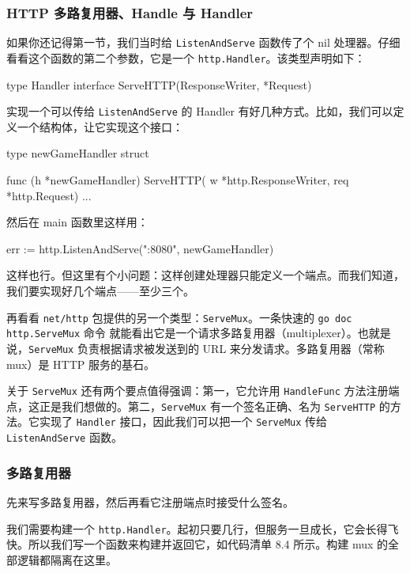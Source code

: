 \subsubsection*{HTTP 多路复用器、Handle 与 Handler}

如果你还记得第一节，我们当时给 \texttt{ListenAndServe} 函数传了个 nil 处理器。仔细看看这个函数的第二个参数，它是一个 \texttt{http.Handler}。该类型声明如下：

\begin{gocode}[]
type Handler interface {
    ServeHTTP(ResponseWriter, *Request)
}
\end{gocode}

实现一个可以传给 \texttt{ListenAndServe} 的 Handler 有好几种方式。比如，我们可以定义一个结构体，让它实现这个接口：

\begin{gocode}[]
type newGameHandler struct {}

func (h *newGameHandler) ServeHTTP(
    w *http.ResponseWriter, req *http.Request) {
    ...
}
\end{gocode}

然后在 main 函数里这样用：

\begin{gocode}[]
err := http.ListenAndServe(":8080", newGameHandler{})
\end{gocode}

这样也行。但这里有个小问题：这样创建处理器只能定义一个端点。而我们知道，我们要实现好几个端点——至少三个。

再看看 \texttt{net/http} 包提供的另一个类型：\texttt{ServeMux}。一条快速的 \texttt{go doc http.ServeMux} 命令
就能看出它是一个请求多路复用器（multiplexer）。也就是说，\texttt{ServeMux} 负责根据请求被发送到的 URL 来分发请求。多路复用器（常称 mux）是 HTTP 服务的基石。

关于 \texttt{ServeMux} 还有两个要点值得强调：第一，它允许用 \texttt{HandleFunc} 方法注册端点，这正是我们想做的。第二，\texttt{ServeMux} 有一个签名正确、名为 \texttt{ServeHTTP} 的方法。它实现了 \texttt{Handler} 接口，因此我们可以把一个 \texttt{ServeMux} 传给 \texttt{ListenAndServe} 函数。

\subsubsection*{多路复用器}

先来写多路复用器，然后再看它注册端点时接受什么签名。

我们需要构建一个 \texttt{http.Handler}。起初只要几行，但服务一旦成长，它会长得飞快。所以我们写一个函数来构建并返回它，如代码清单 8.4 所示。构建 mux 的全部逻辑都隔离在这里。

